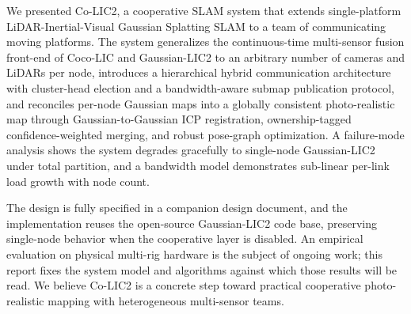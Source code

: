 \label{sec:conclusion}

We presented Co-LIC2, a cooperative SLAM system that extends single-platform
LiDAR-Inertial-Visual Gaussian Splatting SLAM to a team of communicating
moving platforms. The system generalizes the continuous-time multi-sensor
fusion front-end of Coco-LIC and Gaussian-LIC2 to an arbitrary number of
cameras and LiDARs per node, introduces a hierarchical hybrid communication
architecture with cluster-head election and a bandwidth-aware submap
publication protocol, and reconciles per-node Gaussian maps into a globally
consistent photo-realistic map through Gaussian-to-Gaussian ICP registration,
ownership-tagged confidence-weighted merging, and robust pose-graph
optimization. A failure-mode analysis shows the system degrades gracefully to
single-node Gaussian-LIC2 under total partition, and a bandwidth model
demonstrates sub-linear per-link load growth with node count.

The design is fully specified in a companion design document, and the
implementation reuses the open-source Gaussian-LIC2 code base, preserving
single-node behavior when the cooperative layer is disabled. An empirical
evaluation on physical multi-rig hardware is the subject of ongoing work; this
report fixes the system model and algorithms against which those results will
be read. We believe Co-LIC2 is a concrete step toward practical cooperative
photo-realistic mapping with heterogeneous multi-sensor teams.
